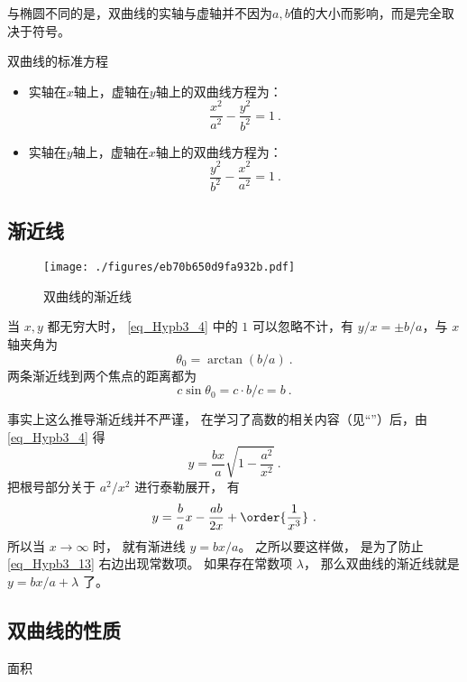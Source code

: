 与椭圆不同的是，双曲线的实轴与虚轴并不因为$a,b$值的大小而影响，而是完全取决于符号。
\begin{theorem}{双曲线的标准方程}
\begin{itemize}
\item 实轴在$x$轴上，虚轴在$y$轴上的双曲线方程为：
\begin{equation}\label{eq_Hypb3_4}
\frac{x^2}{a^2} - \frac{y^2}{b^2} = 1~.
\end{equation}
\item 实轴在$y$轴上，虚轴在$x$轴上的双曲线方程为：
\begin{equation}
\frac{y^2}{b^2} -\frac{x^2}{a^2}  = 1~.
\end{equation}
\end{itemize}
\end{theorem}

\subsection{渐近线}
\begin{figure}[ht]
\centering
\texttt{[image: ./figures/eb70b650d9fa932b.pdf]}
\caption{双曲线的渐近线} \label{fig_Hypb3_1}
\end{figure}

当 $x,y$ 都无穷大时， \autoref{eq_Hypb3_4} 中的 $1$ 可以忽略不计，有 $y/x = \pm b/a$，与 $x$ 轴夹角为
\begin{equation}\label{eq_Hypb3_1}
\theta_0 = \arctan(b/a)~.
\end{equation}
两条渐近线到两个焦点的距离都为
\begin{equation}\label{eq_Hypb3_11}
c\sin\theta_0 = c\cdot b/c = b~.
\end{equation}


事实上这么推导渐近线并不严谨， 在学习了高数的相关内容（见“”）后，由\autoref{eq_Hypb3_4} 得
\begin{equation}
y = \frac{bx}{a} \sqrt{1-\frac{a^2}{x^2}}~.
\end{equation}
把根号部分关于 $a^2/x^2$ 进行泰勒展开， 有
\begin{equation}\label{eq_Hypb3_13}
y = \frac ba x - \frac{ab}{2x} + \order{\frac{1}{x^3}}~.
\end{equation}
所以当 $x\to\infty$ 时， 就有渐进线 $y = bx/a$。 之所以要这样做， 是为了防止\autoref{eq_Hypb3_13} 右边出现常数项。 如果存在常数项 $\lambda$， 那么双曲线的渐近线就是 $y = bx/a + \lambda$ 了。

\subsection{双曲线的性质}
面积









